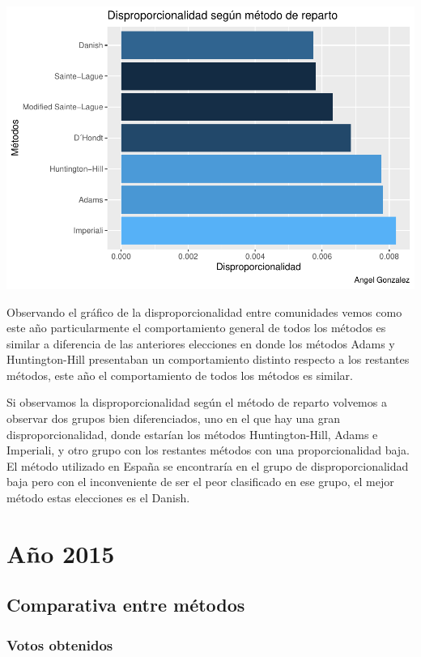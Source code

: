\documentclass[12pt,a4paper,]{book}
\numberwithin{dummy}{section}
\theoremstyle{ocrenumbox}
\theoremstyle{blacknumex}
\theoremstyle{blacknumbox}
\theoremstyle{ocrenum}
\theoremstyle{ocrenum}
\begin{document}
\begin{center}\includegraphics[width=0.95\linewidth]{figurasR/unnamed-chunk-102-2} \end{center}

Observando el gráfico de la disproporcionalidad entre comunidades vemos
como este año particularmente el comportamiento general de todos los
métodos es similar a diferencia de las anteriores elecciones en donde
los métodos Adams y Huntington-Hill presentaban un comportamiento
distinto respecto a los restantes métodos, este año el comportamiento de
todos los métodos es similar.

Si observamos la disproporcionalidad según el método de reparto volvemos
a observar dos grupos bien diferenciados, uno en el que hay una gran
disproporcionalidad, donde estarían los métodos Huntington-Hill, Adams e
Imperiali, y otro grupo con los restantes métodos con una
proporcionalidad baja. El método utilizado en España se encontraría en
el grupo de disproporcionalidad baja pero con el inconveniente de ser el
peor clasificado en ese grupo, el mejor método estas elecciones es el
Danish.

\hypertarget{auxf1o-2015}{%
\section{Año 2015}\label{auxf1o-2015}}

\hypertarget{comparativa-entre-muxe9todos-11}{%
\subsection{Comparativa entre
métodos}\label{comparativa-entre-muxe9todos-11}}

\hypertarget{votos-obtenidos-11}{%
\subsubsection{Votos obtenidos}\label{votos-obtenidos-11}}
\end{document}
